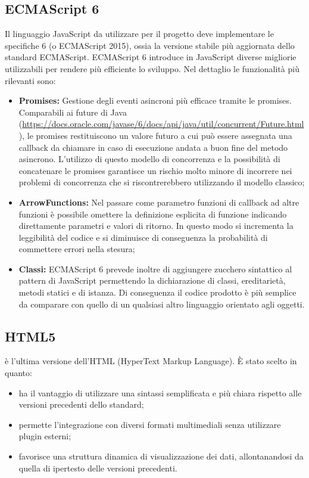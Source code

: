 \subsection{ECMAScript 6}
Il linguaggio JavaScript da utilizzare per il progetto deve implementare le specifiche  6 (o ECMAScript 2015), ossia la versione stabile più aggiornata dello standard ECMAScript. 
ECMAScript 6 introduce in JavaScript diverse migliorie utilizzabili per rendere più efficiente lo sviluppo. Nel dettaglio le funzionalità più rilevanti sono:
\begin{itemize}
	\item \textbf{Promises:} Gestione degli eventi asincroni più efficace tramite le promises. Comparabili ai future di Java (\url{https://docs.oracle.com/javase/6/docs/api/java/util/concurrent/Future.html}), le promises restituiscono un valore futuro a cui può essere assegnata una callback da chiamare in caso di esecuzione andata a buon fine del metodo asincrono. L'utilizzo di questo modello di concorrenza e la possibilità di concatenare le promises garantisce un rischio molto minore di incorrere nei problemi di concorrenza che si riscontrerebbero utilizzando il modello classico;
	\item \textbf{ArrowFunctions:} Nel passare come parametro funzioni di callback ad altre funzioni è possibile omettere la definizione esplicita di funzione indicando direttamente parametri e valori di ritorno. In questo modo si incrementa la leggibilità del codice e si diminuisce di conseguenza la probabilità di commettere errori nella stesura;
	\item \textbf{Classi:} ECMAScript 6 prevede inoltre di aggiungere zucchero sintattico al pattern  di JavaScript permettendo la dichiarazione di classi, ereditarietà, metodi statici e di istanza. Di conseguenza il codice prodotto è più semplice da comparare con quello di un qualsiasi altro  linguaggio orientato agli oggetti.
\end{itemize}

\subsection{HTML5}
 è l'ultima versione dell'HTML (HyperText Markup Language). È stato scelto in quanto:
\begin{itemize}
	\item ha il vantaggio di utilizzare una sintassi semplificata e più chiara rispetto alle versioni precedenti dello standard;
	\item permette l'integrazione con diversi formati multimediali senza utilizzare plugin esterni; 
	\item favorisce una struttura dinamica di visualizzazione dei dati, allontanandosi da quella di ipertesto delle versioni precedenti.
\end{itemize}

